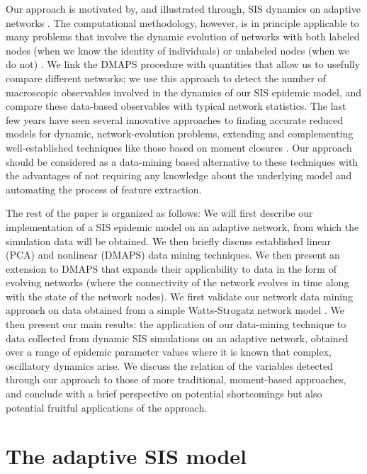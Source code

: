 Our approach is motivated by, and illustrated through, SIS dynamics on
adaptive networks
\cite{gross_epidemic_2006,gross_adaptive_2008,gross_robust_2008}. The
computational methodology, however, is in principle applicable to many
problems that involve the dynamic evolution of networks with both
labeled nodes (when we know the identity of individuals) or unlabeled
nodes (when we do not)
\cite{sayama_modeling_2013,huepe_adaptive-network_2011}. We link the
DMAPS procedure with quantities that allow us to usefully compare
different networks; we use this approach to detect the number of
macroscopic observables involved in the dynamics of our SIS epidemic
model, and compare these data-based observables with typical network
statistics. The last few years have seen several innovative approaches
to finding accurate reduced models for dynamic, network-evolution
problems, extending and complementing well-established techniques like
those based on moment closures \cite{gross_robust_2008}. Our approach
should be considered as a data-mining based alternative to these
techniques with the advantages of not requiring any knowledge about
the underlying model and automating the process of feature extraction.

The rest of the paper is organized as follows: We will first describe
our implementation of a SIS epidemic model on an adaptive network,
from which the simulation data will be obtained. We then briefly
discuss established linear (PCA) and nonlinear (DMAPS) data mining
techniques. We then present an extension to DMAPS that expands their
applicability to data in the form of evolving networks (where the
connectivity of the network evolves in time along with the state of
the network nodes). We first validate our network data mining approach
on data obtained from a simple Watts-Strogatz network model
\cite{watts_collective_1998}. We then present our main results: the
application of our data-mining technique to data collected from
dynamic SIS simulations on an adaptive network, obtained over a range
of epidemic parameter values where it is known that complex,
oscillatory dynamics arise. We discuss the relation of the variables
detected through our approach to those of more traditional,
moment-based approaches, and conclude with a brief perspective on
potential shortcomings but also potential fruitful applications of the
approach.

\section{The adaptive SIS model}

